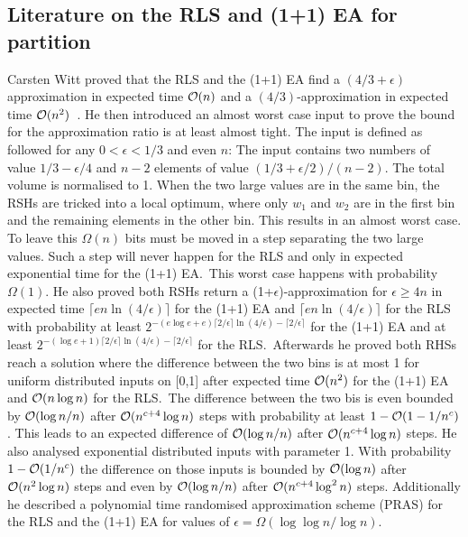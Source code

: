 \subsection{Literature on the RLS and (1+1) EA for partition}
Carsten Witt proved that the RLS and the (1+1) EA find a $(4/3+\epsilon)$ approximation in expected time $\mathcal{O}(n)$ and a $(4/3)$-approximation in expected time $\mathcal{O}(n^2)$~\cite{witt2005worst}.
He then introduced an almost worst case input to prove the bound for the approximation ratio is at least almost tight.
The input is defined as followed for any $0<\epsilon<1/3$ and even $n$:\newline
The input contains two numbers of value $1/3 - \epsilon/4$ and $n-2$ elements of value $(1/3+\epsilon/2)/(n-2)$. 
The total volume is normalised to 1.
When the two large values are in the same bin, the RSHs are tricked into a local optimum, where only $w_1$ and $w_2$ are in the first bin and the remaining elements in the other bin.
This results in an almost worst case.
To leave this $\Omega(n)$ bits must be moved in a step separating the two large values.
Such a step will never happen for the RLS and only in expected exponential time for the (1+1) EA.\
This worst case happens with probability $\Omega(1)$.
He also proved both RSHs return a (1+$\epsilon$)-approximation for $\epsilon\ge4n$ in expected time \(\lceil en\ln(4/\epsilon)\rceil\) for the (1+1) EA and \(\lceil en\ln(4/\epsilon)\rceil\) for the RLS with probability at least \(2^{-(e\log{e}+e)\lceil 2/\epsilon\rceil \ln(4/\epsilon)-\lceil 2/\epsilon\rceil}\) for the (1+1) EA and at least \(2^{-(\log{e}+1)\lceil 2/\epsilon\rceil \ln(4/\epsilon)-\lceil 2/\epsilon\rceil}\) for the RLS.\
Afterwards he proved both RHSs reach a solution where the difference between the two bins is at most 1 for uniform distributed inputs on [0,1] after expected time $\mathcal{O}(n^2)$ for the (1+1) EA and $\mathcal{O}(n\log{n})$ for the RLS.\
The difference between the two bis is even bounded by $\mathcal{O}(\log{n}/n)$ after $\mathcal{O}(n^{c+4}\log{n})$ steps with probability at least $1-\mathcal{O}(1-1/n^c)$.
This leads to an expected difference of $\mathcal{O}(\log{n}/n)$ after $\mathcal{O}(n^{c+4}\log{n})$ steps.
He also analysed exponential distributed inputs with parameter 1.
With probability $1-\mathcal{O}(1/n^c)$ the difference on those inputs is bounded by $\mathcal{O}(\log{n})$ after $\mathcal{O}(n^2\log{n})$ steps and even by $\mathcal{O}(\log{n}/n)$ after $\mathcal{O}(n^{c+4}\log^2{n})$ steps.
Additionally he described a polynomial time randomised approximation scheme (PRAS) for the RLS and the (1+1) EA for values of $\epsilon=\Omega(\log{\log{}}n/\log{n})$.\newline
